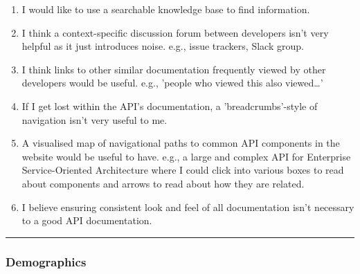 \begin{enumerate}[label=Q7\alph*.,leftmargin=2\parindent]
\item I would like to use a searchable knowledge base to find information.
\item I think a context-specific discussion forum between developers isn't very helpful as it just introduces noise.  
  e.g., issue trackers, Slack group. 
\item I think links to other similar documentation frequently viewed by other developers would be useful. 
   e.g., 'people who viewed this also viewed…' 
\item If I get lost within the API's documentation, a 'breadcrumbs'-style of navigation isn't very useful to me. 
\item A visualised map of navigational paths to common API components in the website would be useful to have. 
   e.g., a large and complex API for Enterprise Service-Oriented Architecture where I could click into various boxes to read about components and arrows to read about how they are related.   
\item I believe ensuring consistent look and feel of all documentation isn't necessary to a good API documentation. 
\end{enumerate}

\bigskip\hrule
\subsubsection*{Demographics}\noindent


